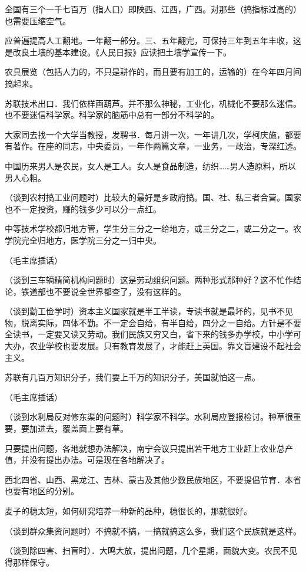 全国有三个一千七百万（指人口）即陕西、江西，广西。对那些（搞指标过高的）也需要压缩空气。

应普遍提高人工翻地。一年翻一部分。三、五年翻完，可保持三年到五年丰收，这是改良土壤的基本建设。《人民日报》应读把土壤学宣传一下。

农具展览（包括人力的，不只是耕作的，而且要有加工的，运输的）在今年四月间搞起来。

苏联技术出口．我们依样画葫芦。并不那么神秘，工业化，机械化不要那么迷信。也不要迷信科学家。科学家的脑筋中总有一部分不科学的。

大家同去找一个大学当教授，发聘书．每月讲一次，一年讲几次，学柯庆施，都要有著作。在座的同志，中央委员，一年作两篇文章，一业务，一政治，专深红透。

中国历来男人是农民，女人是工人。女人是食品制造，纺织……男人造原料，所以男人心粗。

（谈到农村搞工业问题时）比较大的最好是乡政府搞。国、社、私三者合营。国家也不一定投资，赚的钱多少可以分一点红。

中等技术学校都归地方管，学生分三分之一给地方，或三分之二，或二分之一。农学院完全归地方，医学院三分之一归中央。

（毛主席插话）

（谈到三车辆精简机构问题时）这是劳动组织问题。两种形式那种好？这不忙作结论，铁道部也不要说全世界都查了，没有这样的。

（谈到勤工俭学时）资本主义国家就是半工半读，专读书就是最坏的，见书不见物，脱离实际，四体不勤。不一定会自给，有半自给，四分之一自给。方针是不要全读书，一定要又读又劳动。我们民族又穷又白，省下来的钱多办学校，中小学可大办，农业学校也要发展。只有教育发展了，才能赶上英国。靠文盲建设不起社会主义。

苏联有几百万知识分子，我们要上千万的知识分子，美国就怕这一点。

（毛主席插话）

（谈到水利局反对修东渠的问题时）科学家不科学。水利局应登报检讨。种草很重要，要加进去，覆盖面上要有草。

只要提出问题，各地就想办法解决，南宁会议只提出若干地方工业赶上农业总产值，并没有提出办法。可是现在各地解决了。

西北四省、山西、黑龙江、吉林、蒙古及其他少数民族地区，不要提倡节育．本省也要有地区的分别。

麦子的穗太短，如何研究培养一种新的品种，穗很长的，那就很好。

（谈到群众集资问题时）不搞就不搞，一搞就搞这么多，我们这个民族就是这样。

（谈到除四害、扫盲时）．大鸣大放，提出问题，几个星期，面貌大变。农民不见得那样保守。

